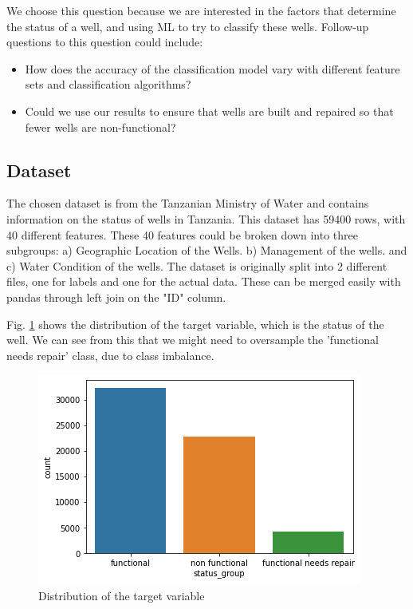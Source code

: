 \documentclass[conference]{IEEEtran}
\begin{document}
We choose this question because we are interested in the factors that determine the status of a well, and using ML to try to classify these wells. Follow-up questions to this question could include:
    \begin{itemize}
        \item How does the accuracy of the classification model vary with different feature sets and classification algorithms?
        \item Could we use our results to ensure that wells are built and repaired so that fewer wells are non-functional?
    \end{itemize}

\subsection{Dataset}

The chosen dataset is from the Tanzanian Ministry of Water and contains information on the status of wells in Tanzania. This dataset has 59400 rows, with 40 different features. These 40 features could be broken down into three subgroups: a) Geographic Location of the Wells. b) Management of the wells. and c) Water Condition of the wells. The dataset is originally split into 2 different files, one for labels and one for the actual data. These can be merged easily with pandas through left join on the "ID" column. 

Fig. \ref{fig:status_groups} shows the distribution of the target variable, which is the status of the well. We can see from this that we might need to oversample the 'functional needs repair' class, due to class imbalance.

\begin{figure}[h]
    \centering
    \includegraphics[scale=0.5]{figures/status_groups.png}
    \caption{Distribution of the target variable}
    \label{fig:status_groups}
\end{figure}
\end{document}
